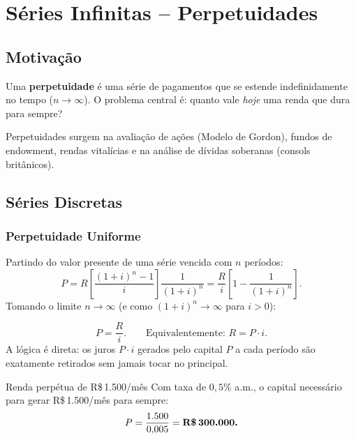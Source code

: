
\chapter{Séries Infinitas -- Perpetuidades}

\section{Motivação}

\begin{definicao}
Uma \textbf{perpetuidade} é uma série de pagamentos que se estende indefinidamente no tempo
($n \to \infty$). O problema central é: quanto vale \emph{hoje} uma renda que dura para sempre?
\end{definicao}

Perpetuidades surgem na avaliação de ações (Modelo de Gordon), fundos de endowment, rendas
vitalícias e na análise de dívidas soberanas (consols britânicos).

\section{Séries Discretas}

\subsection{Perpetuidade Uniforme}

Partindo do valor presente de uma série vencida com $n$ períodos:
\[
  P = R\left[\frac{(1+i)^n-1}{i}\right]\frac{1}{(1+i)^n}
    = \frac{R}{i}\left[1 - \frac{1}{(1+i)^n}\right].
\]
Tomando o limite $n \to \infty$ (e como $(1+i)^n \to \infty$ para $i>0$):

\begin{resultado}
\[
  \boxed{P = \frac{R}{i}.}
  \qquad\text{Equivalentemente: } R = P\cdot i.
\]
A lógica é direta: os juros $P \cdot i$ gerados pelo capital $P$ a cada período são exatamente
retirados sem jamais tocar no principal.
\end{resultado}

\begin{exemplo}{Renda perpétua de R\$\,1.500/mês}
\label{ex:perpetuidade-uniforme}
Com taxa de $0{,}5\%$ a.m., o capital necessário para gerar R\$\,1.500/mês para sempre:
\[
  P = \frac{1{.}500}{0{,}005} = \textbf{R\$\,300.000.}
\]
\end{exemplo}

